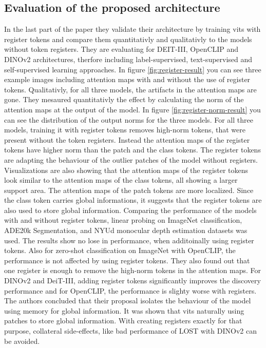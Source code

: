 \documentclass[conference]{IEEEtran}
\begin{document}
  \subsection{Evaluation of the proposed architecture}

  In the last part of the paper they validate their architecture by training \acp{vit} with register tokens and compare them  quantitativly and qualitativly to the models without token registers. They are evaluating for DEIT-III, OpenCLIP and DINOv2 architectures, therfore including label-supervised, text-supervised and self-supervised learning approaches. In figure \ref{fig:register-result} you can see three example images including attention maps with and without the use of register tokens. Qualitativly, for all three models, the artifacts in the attention maps are gone. They mesaured quantitativly the effect by calculating the norm of the attention maps at the output of the model. In figure \ref{fig:register-norm-result} you can see the distribution of the output norms for the three models. For all three models, training it with register tokens removes high-norm tokens, that were present without the token registers. Instead the attention maps of the register tokens have  higher norm than the patch and the class tokens. The register tokens are adapting the behaviour of the outlier patches of the model without registers. Visualizations are also showing that the attention maps of the register tokens look similar to the attention maps of the class tokens, all showing a larger support area. The attention maps of the patch tokens are more localized. Since the class token carries global informations, it suggests that the register tokens are also used to store global information. 
  Comparing the performance of the models with and without register tokens, linear probing on ImageNet classification, ADE20k Segmentation, and NYUd monocular depth estimation datasets was used. The results show no lose in performance, when additoinally using register tokens. Also for zero-shot classification on ImageNet with OpenCLIP, the performance is not affected by using register tokens. They also found out that one register is enough to remove the high-norm tokens in the attention maps. For DINOv2 and DeiT-III, adding register tokens significantly improves the discovery performance and for OpenCLIP, the performance is slighty worse with registers. The authors concluded that their proposal isolates the behaviour of the model using memory for global information. It was shown that \acp{vit} naturally using patches to store global information. With creating registers exactly for that purpose, collateral side-effects, like bad performance of LOST with DINOv2 can be avoided.
\end{document}
